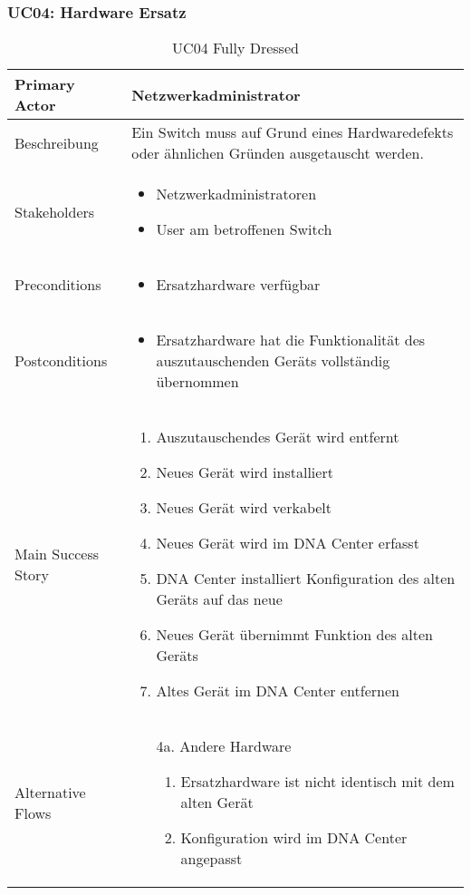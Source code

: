 \subsubsection{UC04: Hardware Ersatz}
\begin{table}[H]
	\centering
	\begin{tabularx}{\textwidth}{l | X}
		Primary Actor   & Netzwerkadministrator        \\
		\hline
		Beschreibung   & Ein Switch muss auf Grund eines Hardwaredefekts oder ähnlichen Gründen ausgetauscht werden.  \\ 
		\hline
		Stakeholders       & 
		\begin{itemize}
			\item Netzwerkadministratoren
			\item User am betroffenen Switch
		\end{itemize} \\ 
		Preconditions      &
		\begin{itemize}	
			\item Ersatzhardware verfügbar
		\end{itemize}  \\
		\hline
		Postconditions     & 
		\begin{itemize}	
			\item Ersatzhardware hat die Funktionalität des auszutauschenden Geräts vollständig übernommen
		\end{itemize}  \\
		\hline
		Main Success Story & 
		\begin{enumerate}
			\item Auszutauschendes Gerät wird entfernt
			\item Neues Gerät wird installiert
			\item Neues Gerät wird verkabelt
			\item Neues Gerät wird im DNA Center erfasst
			\item DNA Center installiert Konfiguration des alten Geräts auf das neue
			\item Neues Gerät übernimmt Funktion des alten Geräts
			\item Altes Gerät im DNA Center entfernen
		\end{enumerate}
		\\
		\hline
		Alternative Flows  & 
		\begin{itemize}
			\item[4a.] Andere Hardware
			\begin{enumerate}
				\item Ersatzhardware ist nicht identisch mit dem alten Gerät
				\item Konfiguration wird im DNA Center angepasst
			\end{enumerate} 
		\end{itemize}
	\end{tabularx}
	\caption{UC04 Fully Dressed}
	\label{tab:UC04}
\end{table}

